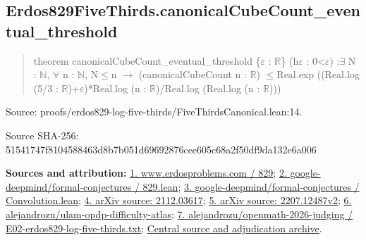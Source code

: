 \documentclass[11pt,a4paper]{article}
\begin{document}
\begin{samepage}
\subsection{Erdos829FiveThirds.canonicalCubeCount\_eventual\_threshold}
\begin{quote}\small\ttfamily theorem canonicalCubeCount\_eventual\_threshold \{\ensuremath{\varepsilon} : \ensuremath{\mathbb{R}}\} (h\ensuremath{\varepsilon} : 0<\ensuremath{\varepsilon}) :\newline     \ensuremath{\exists} N : \ensuremath{\mathbb{N}}, \ensuremath{\forall} n : \ensuremath{\mathbb{N}}, N\ensuremath{\leq}n \ensuremath{\to} (canonicalCubeCount n : \ensuremath{\mathbb{R}}) \ensuremath{\leq}\newline       Real.exp ((Real.log (5/3 : \ensuremath{\mathbb{R}})+\ensuremath{\varepsilon})*Real.log (n : \ensuremath{\mathbb{R}})/Real.log (Real.log (n : \ensuremath{\mathbb{R}})))\end{quote}
{\small Source: proofs/erdos829-log-five-thirds/FiveThirdsCanonical.lean:14.\par}

{\small Source SHA-256: 51541747f8104588463d8b7b051d69692876cee605c68a2f50df9da132e6a006\par}

{\small\textbf{Sources and attribution:} \href{https://www.erdosproblems.com/829}{1. www.erdosproblems.com / 829}; \href{https://github.com/google-deepmind/formal-conjectures/blob/main/FormalConjectures/ErdosProblems/829.lean}{2. google-deepmind/formal-conjectures / 829.lean}; \href{https://github.com/google-deepmind/formal-conjectures/blob/main/FormalConjecturesForMathlib/Combinatorics/Additive/Convolution.lean}{3. google-deepmind/formal-conjectures / Convolution.lean}; \href{https://arxiv.org/html/2112.03617}{4. arXiv source: 2112.03617}; \href{https://arxiv.org/html/2207.12487v2}{5. arXiv source: 2207.12487v2}; \href{https://github.com/alejandrozu/ulam-opdp-difficulty-atlas}{6. alejandrozu/ulam-opdp-difficulty-atlas}; \href{https://github.com/alejandrozu/openmath-2026-judging/blob/d0ed487f487fa7ec814ff705ab55249983fe8707/OpenMath-Judging/review/entries/E02-erdos829-log-five-thirds.txt}{7. alejandrozu/openmath-2026-judging / E02-erdos829-log-five-thirds.txt}; \href{https://github.com/alejandrozu/openmath-2026-judging}{Central source and adjudication archive}.\par}

\end{samepage}
\clearpage
\end{document}
